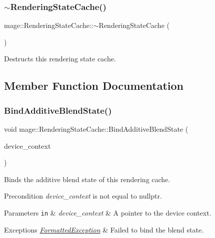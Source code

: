 \subsubsection{\texorpdfstring{$\sim$\+Rendering\+State\+Cache()}{~RenderingStateCache()}}
{\footnotesize\ttfamily mage\+::\+Rendering\+State\+Cache\+::$\sim$\+Rendering\+State\+Cache (\begin{DoxyParamCaption}{ }\end{DoxyParamCaption})\hspace{0.3cm}{\ttfamily [default]}}

Destructs this rendering state cache. 

\subsection{Member Function Documentation}
\hypertarget{structmage_1_1_rendering_state_cache_a8c5922566dc5a27a59d2ceeeda588122}{}\label{structmage_1_1_rendering_state_cache_a8c5922566dc5a27a59d2ceeeda588122} 
\subsubsection{\texorpdfstring{Bind\+Additive\+Blend\+State()}{BindAdditiveBlendState()}}
{\footnotesize\ttfamily void mage\+::\+Rendering\+State\+Cache\+::\+Bind\+Additive\+Blend\+State (\begin{DoxyParamCaption}\item[{I\+D3\+D11\+Device\+Context2 $\ast$}]{device\+\_\+context }\end{DoxyParamCaption})}

Binds the additive blend state of this rendering cache.

\begin{DoxyPrecond}{Precondition}
{\itshape device\+\_\+context} is not equal to {\ttfamily nullptr}. 
\end{DoxyPrecond}

\begin{DoxyParams}[1]{Parameters}
\mbox{\tt in}  & {\em device\+\_\+context} & A pointer to the device context. \\
\hline
\end{DoxyParams}

\begin{DoxyExceptions}{Exceptions}
{\em \hyperlink{structmage_1_1_formatted_exception}{Formatted\+Exception}} & Failed to bind the blend state. \\
\hline
\end{DoxyExceptions}
\hypertarget{structmage_1_1_rendering_state_cache_ae75ffcffc15495f968044f200923b702}{}\label{structmage_1_1_rendering_state_cache_ae75ffcffc15495f968044f200923b702} 
